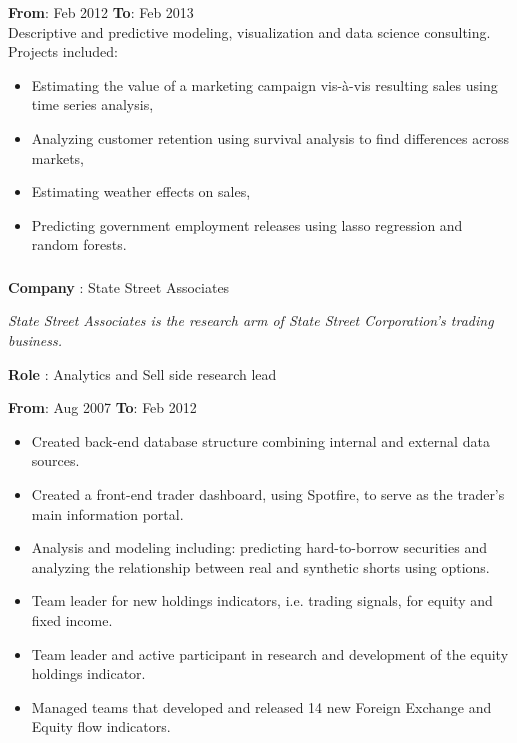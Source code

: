 \documentclass[
]{article}
\providecommand{\tightlist}{%
  \setlength{\itemsep}{0pt}\setlength{\parskip}{0pt}}
\begin{document}
\textbf{From}: Feb 2012 \hspace{0.5in}  \textbf{To}: Feb 2013\\
Descriptive and predictive modeling, visualization and data science
consulting. Projects included:

\begin{itemize}
\tightlist
\item
  Estimating the value of a marketing campaign vis-à-vis resulting sales
  using time series analysis,
\item
  Analyzing customer retention using survival analysis to find
  differences across markets,
\item
  Estimating weather effects on sales,
\item
  Predicting government employment releases using lasso regression and
  random forests.
\end{itemize}

\hypertarget{ssa}{%
\subsubsection{}\label{ssa}}
\begin{flushleft}
\textbf{Company} : State Street Associates
\end{flushleft}

{\hspace{0.1in} \footnotesize \emph{State Street Associates is the research arm of State Street Corporation's trading business.}}


\begin{flushleft}
\textbf{Role} : Analytics and Sell side research lead
\end{flushleft}

\textbf{From}: Aug 2007 \hspace{0.5in}  \textbf{To}: Feb 2012 \\

 

  \begin{itemize}
  \tightlist
  \item
    Created back-end database structure combining internal and external
    data sources.
  \item
    Created a front-end trader dashboard, using Spotfire, to serve as
    the trader's main information portal.
  \item
    Analysis and modeling including: predicting hard-to-borrow
    securities and analyzing the relationship between real and synthetic
    shorts using options.

  \item
    Team leader for new holdings indicators, i.e. trading signals, for
    equity and fixed income.
  \item
    Team leader and active participant in research and development of
    the equity holdings indicator.
  \item
    Managed teams that developed and released 14 new Foreign Exchange
    and Equity flow indicators.
  \end{itemize}
\end{document}
